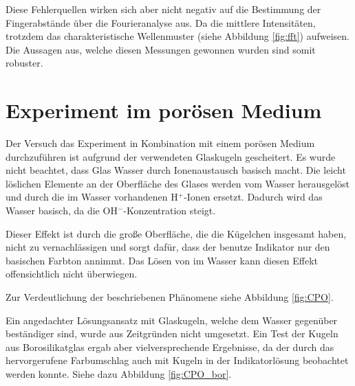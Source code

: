 Diese Fehlerquellen wirken sich aber nicht negativ auf die Bestimmung der Fingerabstände über die Fourieranalyse aus. Da die mittlere Intensitäten, trotzdem das charakteristische Wellenmuster (siehe Abbildung \ref{fig:fft}) aufweisen. Die Aussagen aus, welche diesen Messungen gewonnen wurden sind somit robuster.


\newpage
\section{\COT Experiment im porösen Medium}
\label{res:cpm}



Der Versuch das \COT Experiment in Kombination mit einem porösen Medium durchzuführen ist aufgrund der verwendeten Glaskugeln gescheitert. Es wurde nicht beachtet, dass Glas Wasser durch Ionenaustausch basisch macht. Die leicht löslichen Elemente an der Oberfläche des Glases werden vom Wasser herausgelöst und durch die im Wasser vorhandenen H$^+$-Ionen ersetzt. Dadurch wird das Wasser basisch, da die OH$^-$-Konzentration steigt. \citep{Vogel}

Dieser Effekt ist durch die große Oberfläche, die die Kügelchen insgesamt haben, nicht zu vernachlässigen und sorgt dafür, dass der benutze Indikator nur den basischen Farbton annimmt. Das Lösen von \COT im Wasser kann diesen Effekt offensichtlich nicht überwiegen.

Zur Verdeutlichung der beschriebenen Phänomene siehe Abbildung \ref{fig:CPO}.

Ein angedachter Lösungsansatz mit Glaskugeln, welche dem Wasser gegenüber beständiger sind, wurde aus Zeitgründen nicht umgesetzt. Ein Test der Kugeln aus Borosilikatglas ergab aber vielversprechende Ergebnisse, da der durch das \COT hervorgerufene Farbumschlag auch mit Kugeln in der Indikatorlösung beobachtet werden konnte. Siehe dazu Abbildung \ref{fig:CPO_bor}.


